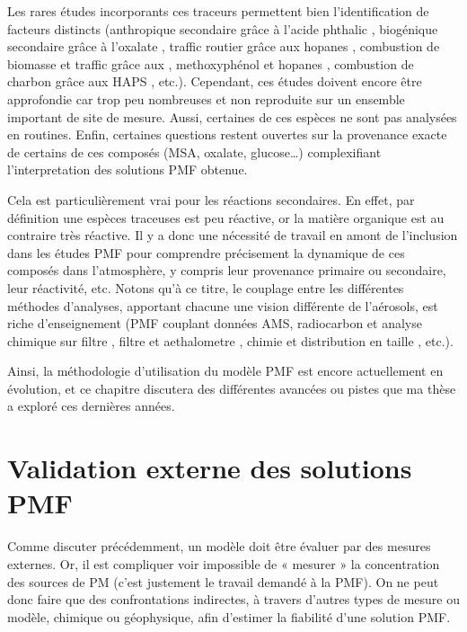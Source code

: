 Les rares études incorporants ces traceurs permettent bien l'identification de facteurs
distincts (anthropique secondaire grâce à l'acide phthalic
\autocite{srivastavaSpeciation2018a}, biogénique secondaire grâce à l'oxalate
\autocite{petitSources2019}, traffic routier grâce aux hopanes
\autocite{srivastavaSpeciation2018a}, combustion de biomasse et traffic grâce aux
, methoxyphénol et hopanes \autocite{chevrierChauffage2016}, combustion de
charbon grâce aux HAPS \autocite{gollyEtude2014}, etc.).
Cependant, ces études doivent encore être approfondie car trop peu nombreuses et non
reproduite sur un ensemble important de site de mesure. Aussi, certaines de ces espèces ne
sont pas analysées en routines.
Enfin, certaines questions restent ouvertes sur la provenance exacte de certains de ces
composés (MSA, oxalate, glucose…) complexifiant l'interpretation des solutions PMF
obtenue.

Cela est particulièrement vrai pour les réactions secondaires. En effet, par définition
une espèces traceuses est peu réactive, or la matière organique est au contraire très
réactive. Il y a donc une nécessité de travail en amont de l'inclusion dans les études PMF
pour comprendre précisement la dynamique de ces composés dans l'atmosphère, y compris leur
provenance primaire ou secondaire, leur réactivité, etc. 
Notons qu'à ce titre, le couplage entre les différentes méthodes d'analyses, apportant
chacune une vision différente de l'aérosols, est riche d'enseignement (PMF couplant
données AMS, radiocarbon et analyse chimique sur filtre \autocite{vlachouDevelopment2019},
filtre et aethalometre \autocite{chevrierChauffage2016}, chimie et distribution en taille
\autocite{bozzettiSizeResolved2016}, etc.).

Ainsi, la méthodologie d'utilisation du modèle PMF est encore actuellement en évolution,
et ce chapitre discutera des différentes avancées ou pistes que ma thèse a exploré ces
dernières années.

\section{Validation externe des solutions PMF}%
\label{sec:confrontation_des_solutions_pmf}

Comme discuter précédemment, un modèle doit être évaluer par des mesures externes. Or, il
est compliquer voir impossible de « mesurer » la concentration des sources de PM (c'est
justement le travail demandé à la PMF). On ne peut donc faire que des confrontations
indirectes, à travers d'autres types de mesure ou modèle, chimique ou géophysique, afin
d'estimer la fiabilité d'une solution PMF.

